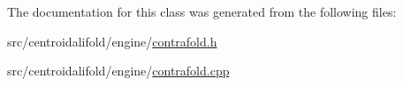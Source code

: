 The documentation for this class was generated from the following files\+:\begin{DoxyCompactItemize}
\item 
src/centroidalifold/engine/\hyperlink{engine_2contrafold_8h}{contrafold.\+h}\item 
src/centroidalifold/engine/\hyperlink{contrafold_8cpp}{contrafold.\+cpp}\end{DoxyCompactItemize}
